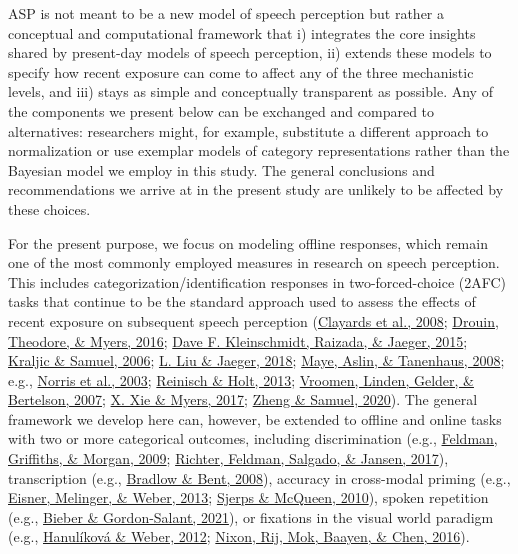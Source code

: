 \documentclass[
  11pt,
  english,
  man,floatsintext]{apa6}
\begin{document}
ASP is not meant to be a new model of speech perception but rather a conceptual and computational framework that i) integrates the core insights shared by present-day models of speech perception, ii) extends these models to specify how recent exposure can come to affect any of the three mechanistic levels, and iii) stays as simple and conceptually transparent as possible. Any of the components we present below can be exchanged and compared to alternatives: researchers might, for example, substitute a different approach to normalization or use exemplar models of category representations rather than the Bayesian model we employ in this study. The general conclusions and recommendations we arrive at in the present study are unlikely to be affected by these choices.

For the present purpose, we focus on modeling offline responses, which remain one of the most commonly employed measures in research on speech perception. This includes categorization/identification responses in two-forced-choice (2AFC) tasks that continue to be the standard approach used to assess the effects of recent exposure on subsequent speech perception (\protect\hyperlink{ref-clayards2008}{Clayards et al., 2008}; \protect\hyperlink{ref-drouin2016}{Drouin, Theodore, \& Myers, 2016}; \protect\hyperlink{ref-kleinschmidt2015}{Dave F. Kleinschmidt, Raizada, \& Jaeger, 2015}; \protect\hyperlink{ref-kraljic-samuel2006}{Kraljic \& Samuel, 2006}; \protect\hyperlink{ref-liu-jaeger2018}{L. Liu \& Jaeger, 2018}; \protect\hyperlink{ref-maye2008}{Maye, Aslin, \& Tanenhaus, 2008}; e.g., \protect\hyperlink{ref-norris2003}{Norris et al., 2003}; \protect\hyperlink{ref-reinisch-holt2013}{Reinisch \& Holt, 2013}; \protect\hyperlink{ref-vroomen2007}{Vroomen, Linden, Gelder, \& Bertelson, 2007}; \protect\hyperlink{ref-xie2017}{X. Xie \& Myers, 2017}; \protect\hyperlink{ref-zheng-samuel2020}{Zheng \& Samuel, 2020}). The general framework we develop here can, however, be extended to offline and online tasks with two or more categorical outcomes, including discrimination (e.g., \protect\hyperlink{ref-feldman2009}{Feldman, Griffiths, \& Morgan, 2009}; \protect\hyperlink{ref-richter2017}{Richter, Feldman, Salgado, \& Jansen, 2017}), transcription (e.g., \protect\hyperlink{ref-bradlow-bent2008}{Bradlow \& Bent, 2008}), accuracy in cross-modal priming (e.g., \protect\hyperlink{ref-eisner2013}{Eisner, Melinger, \& Weber, 2013}; \protect\hyperlink{ref-sjerps-mcqueen2010}{Sjerps \& McQueen, 2010}), spoken repetition (e.g., \protect\hyperlink{ref-bieber2021}{Bieber \& Gordon-Salant, 2021}), or fixations in the visual world paradigm (e.g., \protect\hyperlink{ref-hanulikova-weber2012}{Hanulíková \& Weber, 2012}; \protect\hyperlink{ref-nixon2016}{Nixon, Rij, Mok, Baayen, \& Chen, 2016}).
\end{document}
